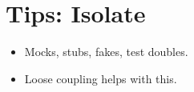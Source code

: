 \documentclass{article}
\begin{document}
\sloppy
\section{Tips: Isolate}
\begin{itemize}
    \item Mocks, stubs, fakes, test doubles.
    \item Loose coupling helps with this.
\end{itemize}
\end{document}
